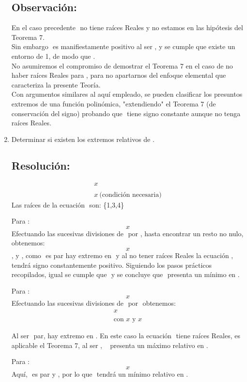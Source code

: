 \documentclass[12pt]{article}
\begin{document}
\begin{enumerate}
        \subsection*{Observación:}
        En el caso precedente $ $ no tiene raíces Reales y no estamos en las hipótesis del Teorema 7.\\
        Sin embargo $ $ es manifiestamente positivo al ser $ $, y se cumple que existe un entorno de 1, de modo que $ $.\\
        No asumiremos el compromiso de demostrar el Teorema 7 en el caso de no haber raíces Reales para $ $, para no apartarnos del enfoque elemental que caracteriza la presente Teoría.\\
        Con argumentos similares al aquí empleado, se pueden clasificar los presuntos extremos de una función polinómica, "extendiendo" el Teorema 7 (de conservación del signo) probando que $ $ tiene signo constante aunque no tenga raíces Reales.

  \item Determinar si existen los extremos relativos de $ $.

        \subsection*{Resolución:}
        $$
          \begin{array}{ccc}
            x \\
            \\
            x \ \text{(condición necesaria)}
          \end{array}
        $$
        Las raíces de la ecuación $ $ son: \{1,3,4\}

        Para $ $:
        $$
          x
        $$
        Efectuando las sucesivas divisiones de $ $ por $ $, hasta encontrar un resto no nulo, obtenemos:
        $$
          x
        $$
        $ $, y $ $, como $ $ es par hay extremo en $ $ y al no tener raíces Reales la ecuación $ $, $ $ tendrá signo constantemente positivo. Siguiendo los pasos prácticos recopilados, igual se cumple que $ $ y se concluye que $ $ presenta un mínimo en $ $.

        Para $ $:
        $$
          x
        $$
        Efectuando las sucesivas divisiones de $ $ por $ $ obtenemos:
        $$
          \begin{array}{ccc}
            x \\
            \\
            \text{con \ } x \text{ \ y } x
          \end{array}
        $$

        Al ser $ $ par, hay extremo en $ $. En este caso la ecuación $ $ tiene raíces Reales, es aplicable el Teorema 7, al ser $ $, \ $ $ presenta un máximo relativo en $ $.

        Para $ $:
        $$
          x
        $$
        Aquí, $ $ es par y $ $, por lo que $ $ tendrá un mínimo relativo en $ $.
\end{enumerate}
\end{document}
